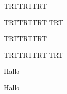 \documentclass{scrbook}
\newcommand{\textsyriac}[1] %
       {\bgroup\luatextextdir TRT\syriacfont #1\egroup}
\newenvironment{syriac}     %
       {\luatextextdir TRT\luatexpardir TRT\luatexbodydir TRT%
       \syriacfont}{}
\begin{document}
\the\luatexbodydir
   \begin{syriac}
    \beginnumbering

\pstart 
        \lipsum[5]
    \pend
\begin{syriac}
    \pstart  %
        \textsyriac{}
\pend
\end{syriac}
    \endnumbering
    \end{syriac}

\begin{pages}
    \begin{Leftside}
    \begin{syriac}
    \beginnumbering

\pstart 
        \lipsum[5]
        \lipsum[5]
    \pend
\begin{syriac}
    \pstart  %
        \textsyriac{}
\pend
\end{syriac}
    \endnumbering
    \end{syriac}
    \end{Leftside}

    \begin{Rightside}
    \beginnumbering

\pstart
        Hallo
    \pend

\pstart
        Hallo 
    \pend

    \endnumbering
    \end{Rightside}
\end{pages} 
\Pages
\end{document}
